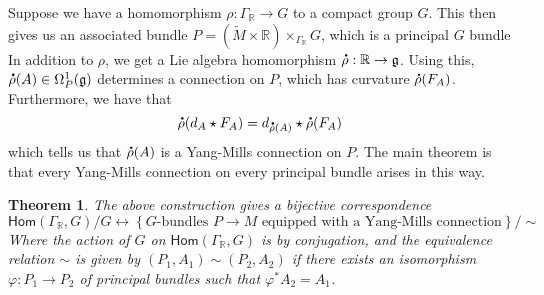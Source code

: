 \documentclass[psamsfonts, 12pt]{amsart}
\newtheorem{thm}{Theorem}[section]
\theoremstyle{definition}
\theoremstyle{remark}
\renewcommand{\hom}{\mathsf{Hom}}
\newcommand{\R}{\mathbb{R}}
\newcommand{\g}{\mathfrak{g}}
\newcommand*{\dt}[1]{%
   \accentset{\mbox{\large\bfseries .}}{#1}}
\newcommand{\set}[1]{\left\lbrace #1 \right\rbrace}
\begin{document}
Suppose we have a homomorphism $\rho : \Gamma_\R \to G$ to a compact group $G$.
This then gives us an associated bundle
$P = (\widetilde{M}\times \R) \times_{\Gamma_\R} G$, which is a principal $G$ bundle
In addition to $\rho$, we get a Lie algebra homomorphism
$\dt{\rho} : \R \to \g$. Using this, $\dt{\rho}(A) \in \Omega^1_P(\g)$ determines
a connection on $P$, which has curvature $\dt{\rho}(F_A)$. Furthermore, we have that
\[
\dt{\rho}(d_A\star F_A) = d_{\dt{\rho}(A)}\star\dt{\rho}(F_A)
\]
which tells us that $\dt{\rho}(A)$ is a Yang-Mills connection on $P$. The main theorem
is that every Yang-Mills connection on every principal bundle arises in this way.
%
\begin{thm}
The above construction gives a bijective correspondence
\[
\hom(\Gamma_\R, G) / G \longleftrightarrow
\set{G\text{-bundles } P \to M
\text{ equipped with a Yang-Mills connection}}/\sim
\]
Where the action of $G$ on $\hom(\Gamma_\R,G)$ is by conjugation, and the
equivalence relation $\sim$ is given by $(P_1,A_1) \sim (P_2,A_2)$ if
there exists an isomorphism $\varphi : P_1 \to P_2$ of principal bundles such that
$\varphi^*A_2 = A_1$.
\end{thm}
%
\end{document}
